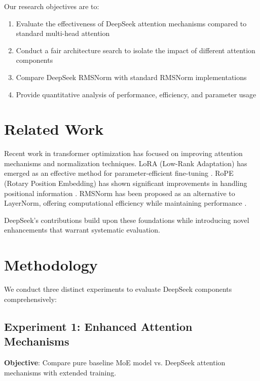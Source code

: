 \documentclass[11pt,a4paper]{article}
\begin{document}
Our research objectives are to:
\begin{enumerate}
    \item Evaluate the effectiveness of DeepSeek attention mechanisms compared to standard multi-head attention
    \item Conduct a fair architecture search to isolate the impact of different attention components
    \item Compare DeepSeek RMSNorm with standard RMSNorm implementations
    \item Provide quantitative analysis of performance, efficiency, and parameter usage
\end{enumerate}

\section{Related Work}

Recent work in transformer optimization has focused on improving attention mechanisms and normalization techniques. LoRA (Low-Rank Adaptation) has emerged as an effective method for parameter-efficient fine-tuning \cite{hu2021lora}. RoPE (Rotary Position Embedding) has shown significant improvements in handling positional information \cite{su2021roformer}. RMSNorm has been proposed as an alternative to LayerNorm, offering computational efficiency while maintaining performance \cite{zhang2019root}.

DeepSeek's contributions build upon these foundations while introducing novel enhancements that warrant systematic evaluation.

\section{Methodology}

We conduct three distinct experiments to evaluate DeepSeek components comprehensively:

\subsection{Experiment 1: Enhanced Attention Mechanisms}

\textbf{Objective}: Compare pure baseline MoE model vs. DeepSeek attention mechanisms with extended training.
\end{document}
